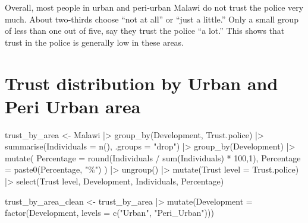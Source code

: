 \documentclass[
  letterpaper,
  DIV=11,
  numbers=noendperiod]{scrartcl}
\newenvironment{Shaded}{\begin{snugshade}}{\end{snugshade}}
\newcommand{\AttributeTok}[1]{\textcolor[rgb]{0.40,0.45,0.13}{#1}}
\newcommand{\DecValTok}[1]{\textcolor[rgb]{0.68,0.00,0.00}{#1}}
\newcommand{\FunctionTok}[1]{\textcolor[rgb]{0.28,0.35,0.67}{#1}}
\newcommand{\NormalTok}[1]{\textcolor[rgb]{0.00,0.23,0.31}{#1}}
\newcommand{\OtherTok}[1]{\textcolor[rgb]{0.00,0.23,0.31}{#1}}
\newcommand{\SpecialCharTok}[1]{\textcolor[rgb]{0.37,0.37,0.37}{#1}}
\newcommand{\StringTok}[1]{\textcolor[rgb]{0.13,0.47,0.30}{#1}}
\begin{document}
Overall, most people in urban and peri‑urban Malawi do not trust the
police very much. About two‑thirds choose ``not at all'' or ``just a
little.'' Only a small group of less than one out of five, say they
trust the police ``a lot.'' This shows that trust in the police is
generally low in these areas.

\section{Trust distribution by Urban and Peri Urban
area}\label{trust-distribution-by-urban-and-peri-urban-area}

\begin{Shaded}
\begin{Highlighting}[]
\NormalTok{trust\_by\_area }\OtherTok{\textless{}{-}}\NormalTok{ Malawi }\SpecialCharTok{|\textgreater{}}
  \FunctionTok{group\_by}\NormalTok{(Development, Trust.police) }\SpecialCharTok{|\textgreater{}}
  \FunctionTok{summarise}\NormalTok{(}\AttributeTok{Individuals =} \FunctionTok{n}\NormalTok{(), }\AttributeTok{.groups =} \StringTok{"drop"}\NormalTok{) }\SpecialCharTok{|\textgreater{}}
  \FunctionTok{group\_by}\NormalTok{(Development) }\SpecialCharTok{|\textgreater{}}
  \FunctionTok{mutate}\NormalTok{(}
    \AttributeTok{Percentage =} \FunctionTok{round}\NormalTok{(Individuals }\SpecialCharTok{/} \FunctionTok{sum}\NormalTok{(Individuals) }\SpecialCharTok{*} \DecValTok{100}\NormalTok{,}\DecValTok{1}\NormalTok{),}
    \AttributeTok{Percentage =} \FunctionTok{paste0}\NormalTok{(Percentage, }\StringTok{"\%"}\NormalTok{)}
\NormalTok{  ) }\SpecialCharTok{|\textgreater{}}
  \FunctionTok{ungroup}\NormalTok{() }\SpecialCharTok{|\textgreater{}}
  \FunctionTok{mutate}\NormalTok{(}\StringTok{\textasciigrave{}}\AttributeTok{Trust level}\StringTok{\textasciigrave{}} \OtherTok{=}\NormalTok{ Trust.police) }\SpecialCharTok{|\textgreater{}}
  \FunctionTok{select}\NormalTok{(}\StringTok{\textasciigrave{}}\AttributeTok{Trust level}\StringTok{\textasciigrave{}}\NormalTok{, Development, Individuals, Percentage)}


\NormalTok{trust\_by\_area\_clean }\OtherTok{\textless{}{-}}\NormalTok{ trust\_by\_area }\SpecialCharTok{|\textgreater{}}
  \FunctionTok{mutate}\NormalTok{(}\AttributeTok{Development =} \FunctionTok{factor}\NormalTok{(Development, }\AttributeTok{levels =} \FunctionTok{c}\NormalTok{(}\StringTok{"Urban"}\NormalTok{, }\StringTok{"Peri\_Urban"}\NormalTok{)))}



\end{Highlighting}
\end{Shaded}
\end{document}
